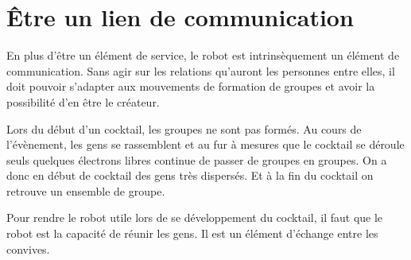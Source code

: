 
\section{\^Etre un lien de communication}

En plus d’être un élément de service, le robot est intrinsèquement un élément de communication. Sans agir sur les relations qu’auront les personnes entre elles, il doit pouvoir s’adapter aux mouvements de formation de groupes et avoir la possibilité d’en être le créateur.

Lors du début d’un cocktail, les groupes ne sont pas formés. Au cours de l’évènement, les gens se rassemblent et au fur à mesures que le cocktail se déroule seuls quelques électrons libres continue de passer de groupes en groupes. On a donc en début de cocktail des gens très dispersés. Et à la fin du cocktail on retrouve un ensemble de groupe.

Pour rendre le robot utile lors de se développement du cocktail, il faut que le robot   est la capacité de réunir les gens. Il est un élément d’échange entre les convives.



